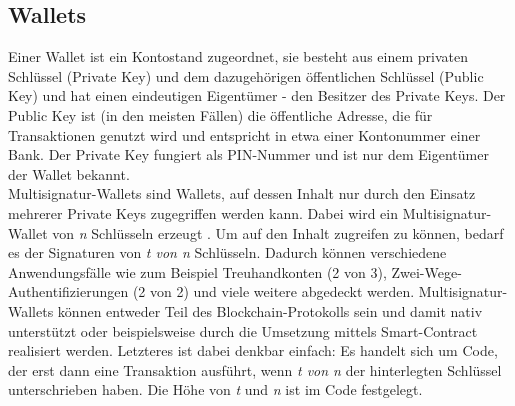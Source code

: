 \subsection{Wallets}
\label{subsec:fundamentals:dlt:wallets}
Einer Wallet ist ein Kontostand zugeordnet, sie besteht aus einem privaten Schlüssel (Private Key) und dem dazugehörigen öffentlichen Schlüssel (Public Key) und hat einen eindeutigen Eigentümer - den Besitzer des Private Keys. Der Public Key ist (in den meisten Fällen) die öffentliche Adresse, die für Transaktionen genutzt wird und entspricht in etwa einer Kontonummer einer Bank. Der Private Key fungiert als PIN-Nummer und ist nur dem Eigentümer der Wallet bekannt.\\
Multisignatur-Wallets sind Wallets, auf dessen Inhalt nur durch den Einsatz mehrerer Private Keys zugegriffen werden kann. Dabei wird ein Multisignatur-Wallet von \textit{n} Schlüsseln erzeugt \cite{multisig2018}. Um auf den Inhalt zugreifen zu können, bedarf es der Signaturen von \textit{t von n} Schlüsseln. Dadurch können verschiedene Anwendungsfälle wie zum Beispiel Treuhandkonten (2 von 3), Zwei-Wege-Authentifizierungen (2 von 2) und viele weitere abgedeckt werden. Multisignatur-Wallets können entweder Teil des Blockchain-Protokolls sein und damit nativ unterstützt oder beispielsweise durch die Umsetzung mittels Smart-Contract realisiert werden. Letzteres ist dabei denkbar einfach: Es handelt sich um Code, der erst dann eine Transaktion ausführt, wenn \textit{t von n} der hinterlegten Schlüssel unterschrieben haben. Die Höhe von \textit{t} und \textit{n} ist im Code festgelegt.

